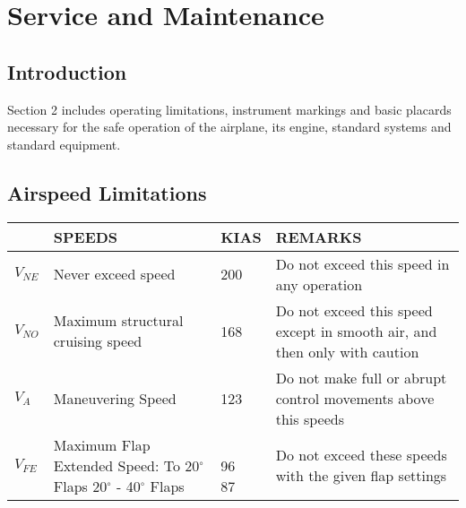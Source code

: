 \chapter{Service and Maintenance}
\thispagestyle{fancy}
\minitoc[n] %

\section{Introduction}
Section 2 includes operating limitations, instrument markings and basic placards necessary for the safe operation of the airplane, its engine, standard systems and standard equipment.

\section{Airspeed Limitations}


\begin{center}
\begin{tabular}{ |p{1cm}|p{6cm}|p{2cm}|p{5cm}| } 
 \hline
  & SPEEDS &  KIAS & REMARKS\\ 
 \hline
 $V_{NE}$ & Never exceed speed & 200 & Do not exceed this speed in any operation\\ 
 \hline
 $V_{NO}$ & Maximum structural cruising speed & 168  & Do not exceed this speed except in smooth air, and then only with caution\\ 
 \hline
 $V_{A}$ & Maneuvering Speed & 123  & Do not make full or abrupt control movements above this speeds \\ 
 \hline
 $V_{FE}$  & \shortstack[l]{Maximum Flap Extended Speed: \\To 20$^{\circ}$ Flaps\\ 20$^{\circ}$ - 40$^{\circ}$ Flaps} & \shortstack[l]{\\96 \\ 87} & Do not exceed these speeds with the given flap settings \\ 
 \hline
\end{tabular}
\end{center}


